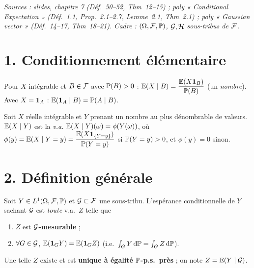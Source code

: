 \documentclass[11pt,a4paper]{article}
\begin{document}

\textit{Sources : slides, chapitre 7 (Déf.~50--52, Thm~12--15) ; poly « Conditional Expectation » (Déf.~1.1, Prop.~2.1--2.7,
Lemme~2.1, Thm~2.1) ; poly « Gaussian vector » (Déf.~14--17, Thm~18--21). Cadre : $(\Omega,\mathcal{F},\mathbb{P})$, $\mathcal{G},\mathcal{H}$ sous-tribus de $\mathcal{F}$.}

\section*{1. Conditionnement élémentaire}

\begin{definition}\label{C6:evt}
Pour $X$ intégrable et $B\in\mathcal{F}$ avec $\mathbb{P}(B)>0$ : $\mathbb{E}(X\mid B)=\dfrac{\mathbb{E}(X\mathbf{1}_B)}{\mathbb{P}(B)}$ (un \emph{nombre}).
Avec $X=\mathbf{1}_A$ : $\mathbb{E}(\mathbf{1}_A\mid B)=\mathbb{P}(A\mid B)$.
\end{definition}

\begin{definition}\label{C6:discret}
Soit $X$ réelle intégrable et $Y$ prenant un nombre au plus dénombrable de valeurs. $\mathbb{E}(X\mid Y)$ est la \emph{v.a.}
$\mathbb{E}(X\mid Y)(\omega)=\phi(Y(\omega))$, où
$\phi(y)=\mathbb{E}(X\mid Y=y)=\dfrac{\mathbb{E}(X\mathbf{1}_{\{Y=y\}})}{\mathbb{P}(Y=y)}$ si $\mathbb{P}(Y=y)>0$, et $\phi(y)=0$ sinon.
\end{definition}

\section*{2. Définition générale}

\begin{definition}\label{C6:def}
Soit $Y\in L^1(\Omega,\mathcal{F},\mathbb{P})$ et $\mathcal{G}\subset\mathcal{F}$ une sous-tribu. L'espérance conditionnelle de $Y$ sachant $\mathcal{G}$ est \emph{toute}
v.a.\ $Z$ telle que
\begin{enumerate}[label=(\roman*)]
  \item $Z$ est \textbf{$\mathcal{G}$-mesurable} ;
  \item $\forall G\in\mathcal{G}$, $\mathbb{E}(\mathbf{1}_GY)=\mathbb{E}(\mathbf{1}_GZ)$ \quad (i.e.\ $\int_GY\,\mathrm{d}\mathbb{P}=\int_GZ\,\mathrm{d}\mathbb{P}$).
\end{enumerate}
Une telle $Z$ existe et est \textbf{unique à égalité $\mathbb{P}$-p.s.\ près} ; on note $Z=\mathbb{E}(Y\mid\mathcal{G})$.
\end{definition}
\end{document}
